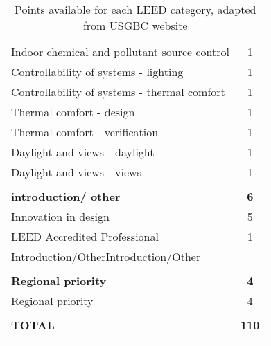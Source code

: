 \documentclass[a4paper,fleqn]{article}
\renewcommand{\cite}{\citep}
\begin{document}
\begin{longtable}[H]{| l | c |}
	Indoor chemical and pollutant source control & 1 \\*
	Controllability of systems - lighting & 1 \\*
	Controllability of systems - thermal comfort & 1 \\*
	Thermal comfort - design & 1 \\*
	Thermal comfort - verification & 1 \\*
	Daylight and views - daylight & 1 \\*
	Daylight and views - views & 1 \\*
	& \\
	\textbf{introduction/ other} & \textbf{6} \\*
	Innovation in design & 5 \\*
	LEED Accredited Professional & 1 \\*
	Introduction/OtherIntroduction/Other & \\*
	& \\*
	\textbf{Regional priority} & \textbf{4} \\*
	Regional priority & 4 \\*
	& \\*
	\hline
	\textbf{TOTAL} & \textbf{110} \\*
	\hline
	\caption{Points available for each LEED category, adapted from USGBC website \cite{LEED2013}}
	\label{tab:LEEDCategories}
\end{longtable}
\end{document}

